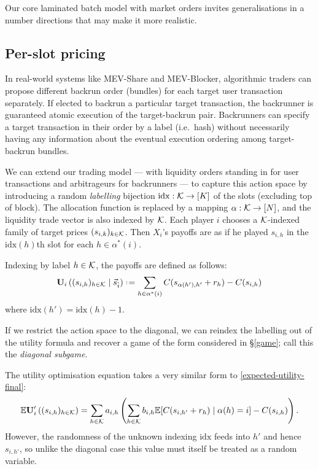 Our core laminated batch model with market orders invites generalisations in a number directions that may make it more realistic.

\subsection{Per-slot pricing} 
\label{multi-price}

In real-world systems like MEV-Share and MEV-Blocker, algorithmic traders can propose different backrun order (bundles) for each target user transaction separately.
%
If elected to backrun a particular target transaction, the backrunner is guaranteed atomic execution of the target-backrun pair.
%
Backrunners can specify a target transaction in their order by a label (i.e.~hash) without necessarily having any information about the eventual execution ordering among target-backrun bundles. 

We can extend our trading model --- with liquidity orders standing in for user transactions and arbitrageurs for backrunners --- to capture this action space by introducing a random \emph{labelling} bijection $\mathrm{idx}:\mathcal{K}\rightarrow [K]$ of the slots (excluding top of block).
%
The allocation function is replaced by a mapping $\alpha:\mathcal{K}\rightarrow[N]$, and the liquidity trade vector is also indexed by $\mathcal{K}$.
%
Each player $i$ chooses a $\mathcal{K}$-indexed family of target prices $(s_{i,k})_{k\in\mathcal{K}}$.
%
Then $X_i$'s payoffs are as if he played $s_{i,h}$ in the $\mathrm{idx}(h)$th slot for each $h\in\alpha^*(i)$.

Indexing by label $h\in\mathcal{K}$, the payoffs are defined as follows:
\begin{equation}
  \Utility_i\left( (s_{i,h})_{h\in\labels} \mid \vec{s}_{\hat{i}} \right) \defeq %
    \sum_{h\in\alpha^*(i)} C(s_{\alpha(h'),h'} + r_h ) - C(s_{i,h})
\end{equation}
where $\mathrm{idx}(h') = \mathrm{idx}(h)-1$.

If we restrict the action space to the diagonal, we can reindex the labelling out of the utility formula and recover a game of the form considered in \S\ref{game}; call this the \emph{diagonal subgame}.

The utility optimisation equation takes a very similar form to \eqref{expected-utility-final}:
\begin{equation}
  \Expectation\Utility'_i\left( (s_{i,h})_{h\in\labels}\right) = %
    \sum_{h\in\labels}a_{i,h}\left(\sum_{h\in\labels}b_{i,h} \Expectation[C(s_{i,h'} + r_h )\mid \alpha(h)=i ] - C(s_{i,h}) \right).
\end{equation}
However, the randomness of the unknown indexing $\mathrm{idx}$ feeds into $h'$ and hence $s_{i,h'}$, so unlike the diagonal case this value must itself be treated as a random variable.

